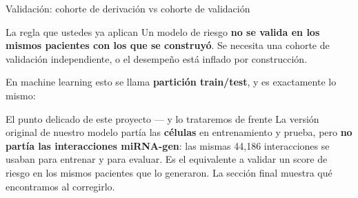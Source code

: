 
\begin{frame}{Validaci\'on: cohorte de derivaci\'on vs cohorte de validaci\'on}
  \begin{block}{La regla que ustedes ya aplican}
    \small
    Un modelo de riesgo \textbf{no se valida en los mismos pacientes con los que se construy\'o}. Se necesita una cohorte de validaci\'on independiente, o el desempe\~no est\'a inflado por construcci\'on.
  \end{block}

  \vspace{0.5em}

  \small
  En machine learning esto se llama \textbf{partici\'on train/test}, y es exactamente lo mismo:

  \begin{center}
  \end{center}

  \vspace{0.5em}
  \begin{block}{El punto delicado de este proyecto --- y lo trataremos de frente}
    \small
    La versi\'on original de nuestro modelo part\'ia las \textbf{c\'elulas} en entrenamiento y prueba, pero \textbf{no part\'ia las interacciones miRNA-gen}: las mismas 44,186 interacciones se usaban para entrenar y para evaluar. Es el equivalente a validar un score de riesgo en los mismos pacientes que lo generaron. La secci\'on final muestra qu\'e encontramos al corregirlo.
  \end{block}
\end{frame}

